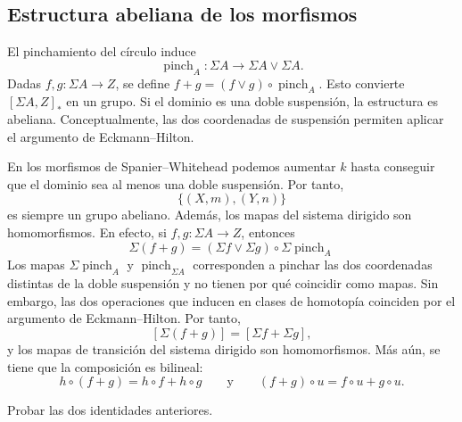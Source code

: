\subsection{Estructura abeliana de los morfismos}

El pinchamiento del círculo induce
\[
\operatorname{pinch}_A\colon\Sigma A\longrightarrow\Sigma A\vee\Sigma A.
\]
Dadas \(f,g\colon\Sigma A\to Z\), se define $f+g=(f\vee g)\circ\operatorname{pinch}_A$.
Esto convierte \([\Sigma A,Z]_*\) en un grupo. Si el dominio es una doble suspensión, la estructura es abeliana. Conceptualmente, las dos coordenadas de suspensión permiten aplicar el argumento de Eckmann--Hilton.

En los morfismos de Spanier--Whitehead podemos aumentar \(k\) hasta conseguir que el dominio sea al menos una doble suspensión. Por tanto,
\[
\bigl\{(X,m),(Y,n)\bigr\}
\]
es siempre un grupo abeliano.
Además, los mapas del sistema dirigido son homomorfismos. En efecto, si \(f,g\colon\Sigma A\to Z\), entonces
\[
\Sigma(f+g)
=(\Sigma f\vee\Sigma g)\circ\Sigma\operatorname{pinch}_A
\]
Los mapas $\Sigma\operatorname{pinch}_A$ y $\operatorname{pinch}_{\Sigma A}$ corresponden a pinchar las dos coordenadas distintas de la doble suspensión y no tienen por qué coincidir como mapas. Sin embargo, las dos operaciones que inducen en clases de homotopía coinciden por el argumento de Eckmann--Hilton. Por tanto,
\[
[\Sigma(f+g)]=[\Sigma f+\Sigma g],
\]
y los mapas de transición del sistema dirigido son homomorfismos.
Más aún, se tiene que la composición es bilineal:
\[
h\circ(f+g)=h\circ f+h\circ g
\qquad\text{y}\qquad
(f+g)\circ u=f\circ u+g\circ u.
\]
\begin{ejer}
Probar las dos identidades anteriores.
\end{ejer}

